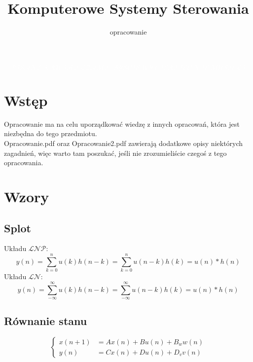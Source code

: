 \documentclass[12pt]{scrartcl}
\title{Komputerowe Systemy Sterowania}
\subtitle{opracowanie}
\author{}
\date{}
\newcommand{\fancy}[1]{\mathcal{#1}}
\begin{document}
\maketitle
\begin{center}
	\textcolor{white}{
	$$\fancy{PISANE\ KRWIA\ I\ LZAMI,\ BYSCIE\ WY\ CIERPIEC\ NIE\ MUSIELI}$$
}
\end{center}
\newpage

\tableofcontents

\newpage

\section{Wstęp}
Opracowanie ma na celu uporządkować wiedzę z innych opracowań, która jest niezbędna do tego przedmiotu.\\ Opracowanie.pdf oraz Opracowanie2.pdf zawierają dodatkowe opisy niektórych zagadnień, więc warto tam poszukać, jeśli nie zrozumieliście czegoś z tego opracowania.


\section{Wzory}
	\subsection{Splot}
    	Układu $\fancy{LNP}$:
    		\begin{equation}\label{eq:splot}
    			y(n)=\sum_{k=0}^{n} u(k)h(n-k) = \sum_{k=0}^{n} u(n-k)h(k)=u(n)*h(n)
    		\end{equation}
    	Układu $\fancy{LN}$:
    		\begin{equation}
    			y(n)=\sum_{-\infty}^{\infty} u(k)h(n-k) = \sum_{-\infty}^{\infty} u(n-k)h(k)=u(n)*h(n)
    		\end{equation}

	\subsection{Równanie stanu}\label{eq:rownanie_stanu}
	\begin{equation}
		\begin{cases}
		x(n+1) &= Ax(n) + Bu(n) + B_{w}w(n)\\
		y(n) &= Cx(n) + Du(n) + D_{v}v(n)
		\end{cases}
	\end{equation}\\
	
\end{document}
